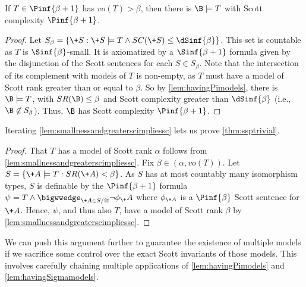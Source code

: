 \documentclass{amsart}
\renewcommand{\-}{\text{-}}
\begin{document}
\begin{lemma}\label{lem:smallnessandgreaterscimpliessc}
If $T\in \Pinf{\beta+1}$ has $vo(T)>\beta$, then there is $\B\models T$ with Scott complexity $\Pinf{\beta+1}$.\end{lemma}
\begin{proof}
  Let $S_\beta=\{ \+S: \+S\models T \land SC(\+S)\leq \dSinf{\beta}\}$. This set is countable as $T$ is $\Sinf{\beta}$-small. It is axiomatized by a $\Sinf{\beta+1}$ formula given by the disjunction of the Scott sentences for each $S\in S_\beta$. Note that the intersection of its complement with models of $T$ is non-empty, as $T$ must have a model of Scott rank greater than or equal to $\beta$. So by \cref{lem:havingPimodels}, there is $\B\models T$, with $SR(\B)\leq \beta$ and Scott complexity greater than $\dSinf{\beta}$ (i.e., $\B\not\in S_\beta$). Thus, $\B$ has Scott complexity $\Pinf{\beta+1}$.
\end{proof}
Iterating \cref{lem:smallnessandgreaterscimpliessc} lets us prove \cref{thm:ssptrivial}.
\ssptrivial* 
\begin{proof}
  That $T$ has a model of Scott rank $\alpha$ follows from \cref{lem:smallnessandgreaterscimpliessc}. Fix $\beta\in (\alpha,vo(T))$. Let $S=\{ \+A\models T: SR(\+A)<\beta\}$. As $S$ has at most countably many isomorphism types, $S$ is definable by the $\Pinf{\beta+1}$ formula $\psi=T\land \bigwwedge_{\+A\in S/{\cong}} \neg\phi_\+A$ where $\phi_{\+A}$ is a $\Pinf{\beta}$ Scott sentence for $\+A$. Hence, $\psi$, and thus also $T$, have a model of Scott rank $\beta$ by \cref{lem:smallnessandgreaterscimpliessc}.
\end{proof}
We can push this argument further to guarantee the existence of multiple models if we sacrifice some control over the exact Scott invariants of those models.
This involves carefully chaining multiple applications of \cref{lem:havingPimodels} and \cref{lem:havingSigmamodels}.
\end{document}
